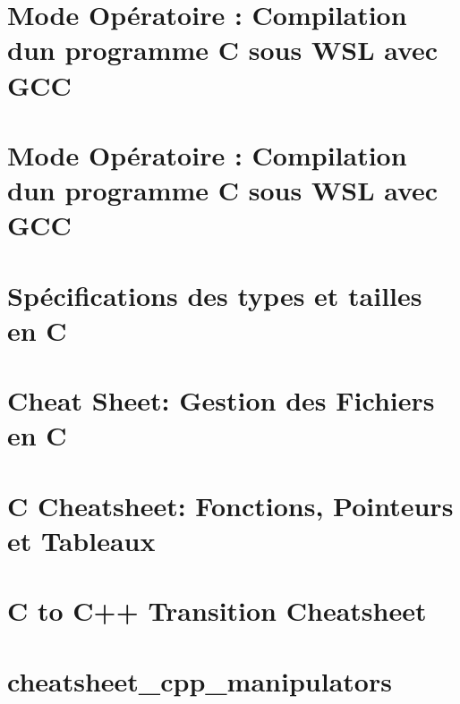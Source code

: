 \documentclass[twoside]{book}
\newcommand{\+}{\discretionary{\mbox{\scriptsize$\hookleftarrow$}}{}{}}
\begin{document}
\chapter{Mode Opératoire \+: Compilation d\textquotesingle{}un programme C sous W\+SL avec G\+CC}
\label{md_programmation_C_cheatsheet_modop_compilation_c}

\chapter{Mode Opératoire \+: Compilation d\textquotesingle{}un programme C sous W\+SL avec G\+CC}
\label{md_programmation_C_cheatsheet_modop_compilation_c_with_lists}

\chapter{Spécifications des types et tailles en C}
\label{md_programmation_C_cheatsheet_modop_compilation_c_with_table}

\chapter{Cheat Sheet\+: Gestion des Fichiers en C}
\label{md_programmation_C_cheatsheet_modop_fichiers}

\chapter{C Cheatsheet\+: Fonctions, Pointeurs et Tableaux}
\label{md_programmation_C_cheatsheet_modop_Fonctions_Pointeurs_Tableaux}

\chapter{C to C++ Transition Cheatsheet}
\label{md_prog_C_vers_C_09_09_cheatsheet_c_to_cpp_cheatsheet}

\chapter{cheatsheet\+\_\+cpp\+\_\+manipulators}
\label{md_prog_C_vers_C_09_09_cheatsheet_cheatsheet_cpp_manipulators}

\end{document}
